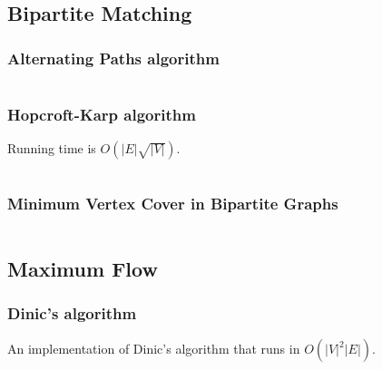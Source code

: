 \documentclass[8pt,a4paper,landscape,oneside]{amsart}
\newcommand{\code}[1]{\inputminted[fontsize=\normalsize,baselinestretch=1]{cpp}{_code/#1}}
\newif\ifverbose
\begin{document}
\begin{multicols*}{3}
    \subsection{Bipartite Matching}

        \subsubsection{Alternating Paths algorithm}
            \ifverbose
            The alternating paths algorithm solves bipartite matching in $O(mn^2)$
            time, where $m$, $n$ are the number of vertices on the left and right
            side of the bipartite graph, respectively.
            \fi
            \code{graph/bipartite_matching.cpp}

        \subsubsection{Hopcroft-Karp algorithm}
            \ifverbose
            An implementation of Hopcroft-Karp algorithm for bipartite
            matching.
            \fi
            Running time is $O(|E|\sqrt{|V|})$.
            \code{graph/hopcroft_karp.cpp}

        \subsubsection{Minimum Vertex Cover in Bipartite Graphs}
            \code{graph/bipartite_mvc.cpp}

    \subsection{Maximum Flow}
        \subsubsection{Dinic's algorithm}
            An implementation of Dinic's algorithm that runs in
            $O(|V|^2|E|)$.
            \ifverbose
            It computes the maximum flow of a flow network.
            \fi
            \code{graph/dinic.cpp}

        \ifverbose
        \subsubsection{Edmonds Karp's algorithm}
            An implementation of Edmonds Karp's algorithm that runs in
            $O(|V||E|^2)$.
            \ifverbose
            It computes the maximum flow of a flow network.
            \fi
            \code{graph/edmonds_karps.cpp}
        \fi


\end{multicols*}
\end{document}
